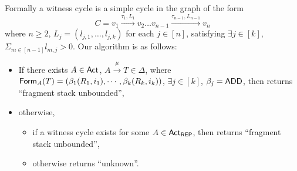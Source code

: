 {Formally a witness cycle is a simple cycle in the graph of the form
$$C = v_1\xrightarrow{\tau_1,L_1}v_2\dots v_{n-1}\xrightarrow{\tau_{n-1}, L_{n-1}}v_n$$
where $n\ge 2$, $L_j = (l_{j,1},\dots,l_{j,k})$ for each $j\in[n]$, satisfying $\exists j\in[k]$, $\Sigma_{m\in[n-1]}l_{m,j}>0$.
Our algorithm is as follows:
\begin{itemize}
    \item If there exists $A\in{\sf Act}$, $A\xrightarrow{\mu}T\in\Delta$, where $\mathsf{Form}_A(T) = (\beta_1(R_1, i_1), \cdots, \beta_k(R_k, i_k))$, $\exists j\in[k]$, $\beta_j = \mathsf{ADD}$, 
        then returns ``fragment stack unbounded'',
    \item otherwise,
        \begin{itemize}
            \item if a witness cycle exists for some $A\in{\sf Act}_{\mathsf{REP}}$, 
        then returns ``fragment stack unbounded'',
    \item otherwise returns ``unknown''.
        \end{itemize}
\end{itemize}
}
 

